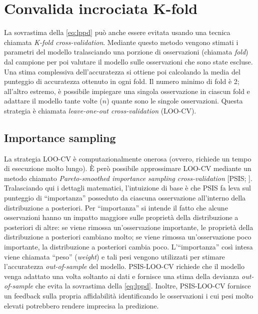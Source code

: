 \documentclass[
  11pt,
]{krantz}
\theoremstyle{definition}
\theoremstyle{definition}
\theoremstyle{definition}
\theoremstyle{definition}
\theoremstyle{remark}
\begin{document}
\hypertarget{convalida-incrociata-k-fold}{%
\section{Convalida incrociata K-fold}\label{convalida-incrociata-k-fold}}

La sovrastima della \eqref{eq:lppd} può anche essere evitata usando una tecnica chiamata \emph{K-fold cross-validation}. Mediante questo metodo vengono stimati i parametri del modello tralasciando una porzione di osservazioni (chiamata \emph{fold}) dal campione per poi valutare il modello sulle osservazioni che sono state escluse. Una stima complessiva dell'accuratezza si ottiene poi calcolando la media del punteggio di accuratezza ottenuto in ogni fold. Il numero minimo di fold è 2; all'altro estremo, è possibile impiegare una singola osservazione in ciascun fold e adattare il modello tante volte (\(n\)) quante sono le singole osservazioni. Questa strategia è chiamata \emph{leave-one-out cross-validation} (LOO-CV).

\hypertarget{importance-sampling}{%
\subsection{Importance sampling}\label{importance-sampling}}

La strategia LOO-CV è computazionalmente onerosa (ovvero, richiede un tempo di esecuzione molto lungo). È però possibile approssimare LOO-CV mediante un metodo chiamato \emph{Pareto-smoothed importance sampling cross-validation} {[}PSIS; \citet{vehtari2017practical}{]}. Tralasciando qui i dettagli matematici, l'intuizione di base è che PSIS fa leva sul punteggio di ``importanza'' posseduto da ciascuna osservazione all'interno della distribuzione a posteriori. Per ``importanza'' si intende il fatto che alcune osservazioni hanno un impatto maggiore sulle proprietà della distribuzione a posteriori di altre: se viene rimossa un'osservazione importante, le proprietà della distribuzione a posteriori cambiano molto; se viene rimossa un'osservazione poco importante, la distribuzione a posteriori cambia poco. L'``importanza'' così intesa viene chiamata ``peso'' (\emph{weight}) e tali pesi vengono utilizzati per stimare l'accuratezza \emph{out-of-sample} del modello. PSIS-LOO-CV richiede che il modello venga adattato una volta soltanto ai dati e fornisce una stima della devianza \emph{out-of-sample} che evita la sovrastima della \eqref{eq:lppd}. Inoltre, PSIS-LOO-CV fornisce un feedback sulla propria affidabilità identificando le osservazioni i cui pesi molto elevati potrebbero rendere imprecisa la predizione.
\end{document}
